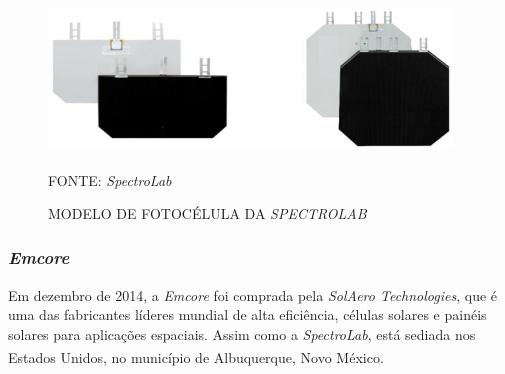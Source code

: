 \documentclass[
	12pt,				%
	openright,			%
	oneside,			%
	a4paper,			%
	english,			%
	french,				%
	spanish,			%
	brazil,				%
	oldfontcommands
	]{abntex2}
\begin{document}
	\begin{figure}[th]
		\caption{MODELO DE FOTOCÉLULA DA \textit{SPECTROLAB}}
		\centering
		\includegraphics[width=1.0\linewidth]{./figs/UTJ}
			
		\begin{small}
			FONTE: \textit{SpectroLab}\textsuperscript{\cite{SpectroLab2}}
		\end{small}		
	\end{figure}

\subsubsection[Emcore]{\textit{Emcore}}

	Em dezembro de 2014, a \textit{Emcore} foi comprada pela \textit{SolAero Technologies}, que é uma das fabricantes líderes mundial de alta eficiência, células solares e painéis solares para aplicações espaciais. Assim como a \textit{SpectroLab}, está sediada nos Estados Unidos, no município de Albuquerque, Novo México.\textsuperscript{\cite{Emcore}}\textsuperscript{\cite{Emcore2}}
	
\end{document}
